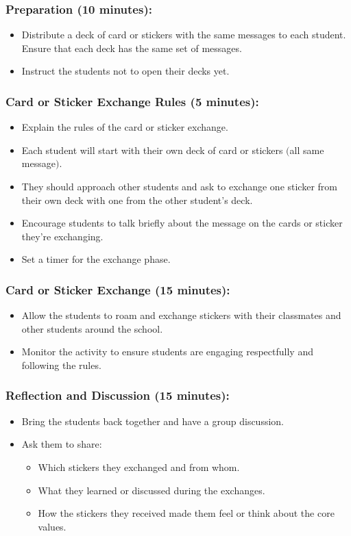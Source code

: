 \documentclass[14pt, letterpaper, twoside]{article}
\begin{document}
	\subsubsection{Preparation (10 minutes):}
	\begin{itemize}
	\item Distribute a deck of card or stickers with the same messages to each student.
	Ensure that each deck has the same set of messages.
	\item Instruct the students not to open their decks yet.
	\end{itemize}
	\subsubsection{Card or Sticker Exchange Rules (5 minutes):}
	\begin{itemize}
	\item Explain the rules of the card or sticker exchange.
	\item Each student will start with their own deck of card or stickers $($all same
	message$)$.
	\item They should approach other students and ask to exchange one sticker from their
	own deck with one from the other student's deck.
	\item Encourage students to talk briefly about the message on the cards or sticker
	they're exchanging.
	\item Set a timer for the exchange phase.
	\end{itemize}
	\subsubsection{Card or Sticker Exchange (15 minutes):}
	\begin{itemize}
	\item Allow the students to roam and exchange stickers with their classmates and other
	students around the school.
	\item Monitor the activity to ensure students are engaging respectfully and following
	the rules.
	\end{itemize}
	\subsubsection{Reflection and Discussion (15 minutes):}
	\begin{itemize}
	\item Bring the students back together and have a group discussion.
	\item Ask them to share:
	\begin{itemize}
	\item Which stickers they exchanged and from whom.
	\item What they learned or discussed during the exchanges.
	\item How the stickers they received made them feel or think about the core values.
	\end{itemize}
	\end{itemize}
\end{document}
